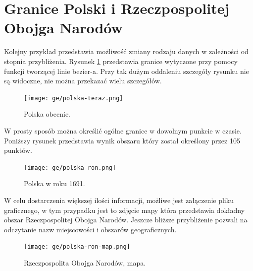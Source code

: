 \section{Granice Polski i Rzeczpospolitej Obojga Narodów}
\label{sec:usahistory}

Kolejny przykład przedstawia możliwość zmiany rodzaju danych w zależności od stopnia przybliżenia. Rysunek \ref{fig:po1} przedstawia granice wytyczone przy pomocy funkcji tworzącej linie bezier-a. Przy tak dużym oddaleniu szczegóły rysunku nie są widoczne, nie można przekazać wielu szczegółów.

\begin{figure}[H]
  \centering
    \texttt{[image: ge/polska-teraz.png]}
  \caption{Polska obecnie.}
  \label{fig:po1}
\end{figure}

W prosty sposób można określić ogólne granice w dowolnym punkcie w czasie. Poniższy rysunek przedstawia wynik obszaru który został określony przez 105 punktów.

\begin{figure}[H]
  \centering
    \texttt{[image: ge/polska-ron.png]}
  \caption{Polska w roku 1691.}
  \label{fig:po2}
\end{figure}

W celu dostarczenia większej ilości informacji, możliwe jest załączenie pliku graficznego, w tym przypadku jest to zdjęcie mapy która przedstawia dokładny obszar Rzeczpospolitej Obojga Narodów. Jeszcze bliższe przybliżenie pozwali na odczytanie nazw miejscowości i obszarów geograficznych. 

\begin{figure}[H]
  \centering
    \texttt{[image: ge/polska-ron-map.png]}
  \caption{Rzeczpospolita Obojga Narodów, mapa.}
  \label{fig:po3}
\end{figure}
